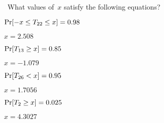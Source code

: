 \begin{problem}
  ~What values of~$x$ satisfy the following equations?
\end{problem}

\begin{subproblem}
  ${\Pr\lbrack-x \leq T_{22} \leq x\rbrack = 0.98}$
\end{subproblem}

$x = 2.508$

\begin{subproblem}
  ${\Pr\lbrack T_{13} \geq x\rbrack = 0.85}$
\end{subproblem}

$x = -1.079$

\begin{subproblem}
  ${\Pr\lbrack T_{26} < x\rbrack = 0.95}$
\end{subproblem}

$x = 1.7056$

\begin{subproblem}
  ${\Pr\lbrack T_{2} \geq x\rbrack = 0.025}$
\end{subproblem}

$x = 4.3027$
